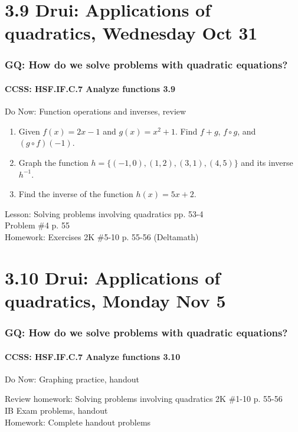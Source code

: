 \documentclass{beamer}
\begin{document}
\section{3.9 Drui: Applications of quadratics, Wednesday Oct 31}
  \frame
  {
    \frametitle{GQ: How do we solve problems with quadratic equations?}
    \framesubtitle{CCSS: HSF.IF.C.7 Analyze functions    \alert{3.9}}

    \begin{block}{Do Now: Function operations and inverses, review}
      \begin{enumerate}
        \item Given $f(x)=2x-1$ and $g(x)=x^2+1$. Find $f+g$, $f \circ g$, and $(g \circ f)(-1)$.
        \item Graph the function $h=\{(-1,0),(1, 2),(3, 1), (4,5)\}$ and its inverse $h^{-1}$.
        \item Find the inverse of the function $h(x)=5x+2$.
      \end{enumerate}
    \end{block}
    Lesson: Solving problems involving quadratics pp. 53-4 \\
    Problem \#4 p. 55 \\ \bigskip
    Homework: Exercises 2K \#5-10 p. 55-56 (Deltamath)
  }

\section{3.10 Drui: Applications of quadratics, Monday Nov 5}
  \frame
  {
    \frametitle{GQ: How do we solve problems with quadratic equations?}
    \framesubtitle{CCSS: HSF.IF.C.7 Analyze functions    \alert{3.10}}

    \begin{block}{Do Now: Graphing practice, handout}
    \end{block}
    Review homework: Solving problems involving quadratics 2K \#1-10 p. 55-56 \\
    IB Exam problems, handout\\ \bigskip
    Homework: Complete handout problems
  }
\end{document}
